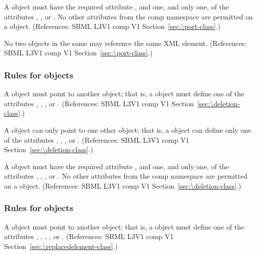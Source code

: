 \begin{sbmlenum}
 { A \Port object must have the
  required attribute , and one, and only one, of the attributes  
  , , or .
  No other attributes from the comp namespace are permitted on a
  \Port object.
  (References: SBML L3V1 comp V1 Section~\ref{sec:\port-class}.) }


 { No two \Port objects in the same \Model may
  reference the same XML element.
  (References: SBML L3V1 comp V1 Section~\ref{sec:\port-class}.) }

\end{sbmlenum} \subsubsection*{Rules for  objects} \begin{sbmlenum}

 { A \Deletion object must point to another object; that is,
  a \Deletion object must define one of the attributes , 
  , , or . 
  (References: SBML L3V1 comp V1 Section~\ref{sec:\deletion-class}.) }


 { A \Deletion object can only point to one other object; that is,
  a \Deletion object can define only one of the attributes  , 
  , , or .
  (References: SBML L3V1 comp V1 Section~\ref{sec:\deletion-class}.) }


 { A \Deletion object must have the
  required attribute , and one, and only one, of the attributes
  , 
  , , or .
  No other attributes from the comp namespace are permitted on a
  \Deletion object.
  (References: SBML L3V1 comp V1 Section~\ref{sec:\deletion-class}.) }

\end{sbmlenum} \subsubsection*{Rules for  objects} \begin{sbmlenum}

 { A \ReplacedElement object must point to another object; that is,
  a \ReplacedElement object must define one of the attributes , 
  , , , or . 
  (References: SBML L3V1 comp V1 Section~\ref{sec:\replacedelement-class}.) }



\end{sbmlenum}
